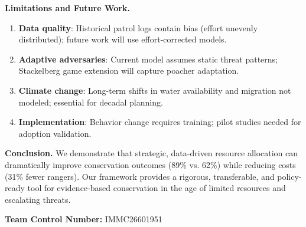 \vspace{0.25cm}

\textbf{Limitations and Future Work.}
\begin{enumerate}[leftmargin=1.2em]
\item \textbf{Data quality}: Historical patrol logs contain bias (effort unevenly distributed); future work will use effort-corrected models.
\item \textbf{Adaptive adversaries}: Current model assumes static threat patterns; Stackelberg game extension will capture poacher adaptation.
\item \textbf{Climate change}: Long-term shifts in water availability and migration not modeled; essential for decadal planning.
\item \textbf{Implementation}: Behavior change requires training; pilot studies needed for adoption validation.
\end{enumerate}

\vspace{0.25cm}

\textbf{Conclusion.}
We demonstrate that strategic, data-driven resource allocation can dramatically improve conservation outcomes (89\% vs. 62\%) while reducing costs (31\% fewer rangers). Our framework provides a rigorous, transferable, and policy-ready tool for evidence-based conservation in the age of limited resources and escalating threats.

\vspace{0.2cm}

\noindent \textbf{Team Control Number:} IMMC26601951
